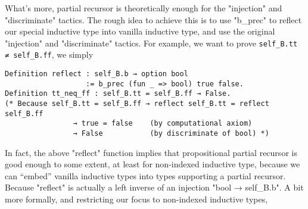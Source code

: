 What's more, partial recursor is theoretically enough for the
"injection" and "discriminate" tactics. The rough idea to achieve this
is to use "b_prec" to reflect our special inductive type into vanilla
inductive type, and use the original "injection" and "discriminate"
tactics. For example, we want to prove \texttt{self_B.tt ≠
self_B.ff}, we simply 
\begin{verbatim}
Definition reflect : self_B.b → option bool 
                   := b_prec (fun _ => bool) true false.
Definition tt_neq_ff : self_B.tt = self_B.ff → False.
(* Because self_B.tt = self_B.ff → reflect self_B.tt = reflect self_B.ff 
                → true = false    (by computational axiom)
                → False           (by discriminate of bool) *)
\end{verbatim}



In fact, the above "reflect" function implies that propositional partial
recursor is good enough to some extent, at least for non-indexed
inductive type, because we can ``embed'' vanilla inductive types into
types supporting a partial recursor. Because "reflect" is actually a left
inverse of an injection "bool → self_B.b". A bit more formally, and
restricting our focus to non-indexed inductive types,

